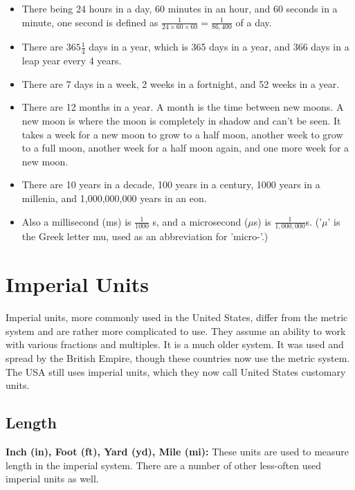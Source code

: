 \documentclass{article}
\begin{document}
\begin{itemize}
\item There being 24 hours in a day, 60 minutes in an hour, and 60 seconds in a minute, one second is defined as $\frac{1}{24\times60\times60}=\frac{1}{86,400}$ of a day.
\item There are $365\frac{1}{4}$ days in a year, which is 365 days in a year, and 366 days in a leap year every 4 years.
\item There are 7 days in a week, 2 weeks in a fortnight, and 52 weeks in a year.
\item There are 12 months in a year. A month is the time between new moons. A new moon is where the moon is completely in shadow and can't be seen. It takes a week for a new moon to grow to a half moon, another week to grow to a full moon, another week for a half moon again, and one more week for a new moon.
\item There are 10 years in a decade, 100 years in a century, 1000 years in a millenia, and 1,000,000,000 years in an eon.
\item Also a millisecond (ms) is $\frac{1}{1000}$ s, and a microsecond ($\mu$s) is $\frac{1}{1,000,000}$s. ('$\mu$' is the Greek letter mu, used as an abbreviation for 'micro-'.)
\end{itemize}

\section*{Imperial Units}
Imperial units, more commonly used in the United States, differ from the metric system and are rather more complicated to use. They assume an ability to work with various fractions and multiples. It is a much older system. It was used and spread by the British Empire, though these countries now use the metric system. The USA still uses imperial units, which they now call United States customary units.

\subsection*{Length}
\textbf{Inch (in), Foot (ft), Yard (yd), Mile (mi):} These units are used to measure length in the imperial system. There are a number of other less-often used imperial units as well.
\end{document}
